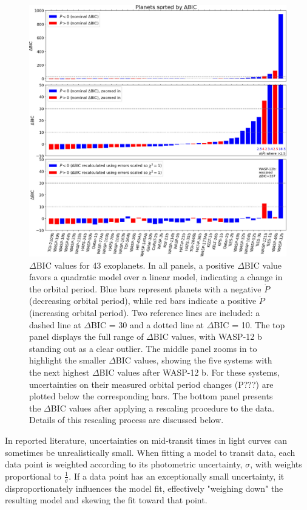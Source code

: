 \documentclass[oneside,12pt]{amsart}
\numberwithin{page}{section}
\begin{document}
\begin{figure}[htbp]
    \centering
    \includegraphics[width=0.9\linewidth]{figs/adams_fig2.jpg}
    \caption{$\Delta$BIC values for 43 exoplanets. In all panels, a positive $\Delta$BIC value favors a quadratic model over a linear model, indicating a change in the orbital period. Blue bars represent planets with a negative $\dot{P}$ (decreasing orbital period), while red bars indicate a positive $\dot{P}$ (increasing orbital period). Two reference lines are included: a dashed line at $\Delta$BIC = 30 and a dotted line at $\Delta$BIC = 10. 
    The top panel displays the full range of $\Delta$BIC values, with WASP-12 b standing out as a clear outlier. The middle panel zooms in to highlight the smaller $\Delta$BIC values, showing the five systems with the next highest $\Delta$BIC values after WASP-12 b. For these systems, uncertainties on their measured orbital period changes (P???) are plotted below the corresponding bars. The bottom panel presents the $\Delta$BIC values after applying a rescaling procedure to the data. Details of this rescaling process are discussed below.}
    \label{fig:adams-fig2}
\end{figure}

In reported literature, uncertainties on mid-transit times in light curves can sometimes be unrealistically small. When fitting a model to transit data, each data point is weighted according to its photometric uncertainty, $\sigma$, with weights proportional to $\frac{1}{\sigma}$. If a data point has an exceptionally small uncertainty, it disproportionately influences the model fit, effectively "weighing down" the resulting model and skewing the fit toward that point.
\end{document}
